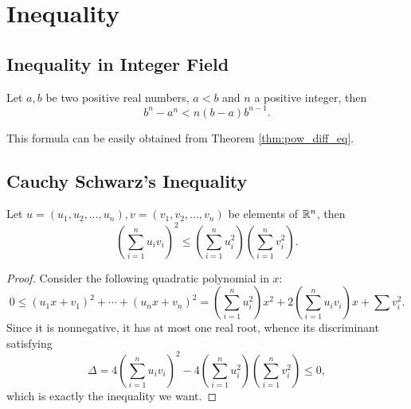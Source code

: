\chapter{Inequality}
\section{Inequality in Integer Field}
\begin{thm}
\label{thm:pow_diff_ineq}
Let $a, b$ be two positive real numbers, $a < b$ and $n$ a 
positive integer, then
\begin{equation}
b^n - a^n < n(b - a)b^{n - 1}.
\end{equation}
\end{thm}

This formula can be easily obtained from Theorem \ref{thm:pow_diff_eq}. 

\section{Cauchy Schwarz's Inequality}
\begin{thm}
Let $u = \left(u_1, u_2, \ldots, u_n \right), v = \left(v_1, v_2, \ldots, 
v_n \right)$ be elements of $\mathbb{R}^n$, then 
\begin{equation}
    \label{equ:inequality:cauchy_schwarz_inequality_rn}
    \left(\sum _{i=1}^{n}u_{i}v_{i}\right)^{2} 
    \leq \left(\sum _{i=1}^{n}u_{i}^{2}\right) 
         \left(\sum _{i=1}^{n}v_{i}^{2}\right).
\end{equation}
\end{thm}
\begin{proof}
Consider the following quadratic polynomial in $x$: 
\begin{equation*}
    0\leq (u_{1}x+v_{1})^{2}+\cdots +(u_{n}x+v_{n})^{2} 
    =\left(\sum_{i=1}^n u_{i}^{2}\right)x^{2} 
        + 2\left(\sum_{i=1}^n u_{i}v_{i}\right)x + \sum v_{i}^{2}.
\end{equation*}
Since it is nonnegative, it has at most one real root, whence its 
discriminant satisfying 
\begin{equation*}
    \Delta = 4 \left( \sum_{i=1}^{n} u_i v_i \right)^2 
        - 4 \left( \sum_{i=1}^{n} u_i^2 \right) \left( \sum_{i=1}^{n} v_i^2 \right) 
    \le 0, 
\end{equation*}
which is exactly the inequality we want. 
\end{proof}

